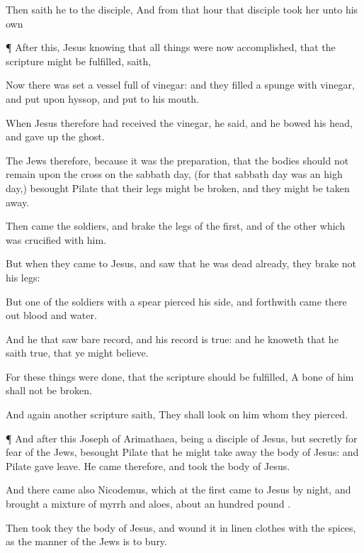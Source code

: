 {Then saith
he to the
disciple,
{}
And
from
that
hour that
disciple
took
her
unto his
own
{}


\par }{\PP {}¶
After
this,
Jesus
knowing
that all
things were
now
accomplished,
that the
scripture might be
fulfilled,
saith,
{}

Now there was
set a
vessel
full of
vinegar:
and they
filled a
spunge with
vinegar,
and
put
{} upon
hyssop, and
put
{} to
his
mouth.

When
Jesus
therefore had
received the
vinegar, he
said,
{}
and he
bowed his
head, and gave
up the
ghost.

The
Jews
therefore,
because it
was the
preparation,
that the
bodies
should
not
remain
upon the
cross
on the sabbath
day, (for
that sabbath
day
was an
high
day,)
besought
Pilate
that
their
legs might be
broken,
and
{} they might be taken
away.

Then
came the
soldiers,
and
brake the
legs of the
first,
and of the
other
which was
crucified with
him.

But
when they
came
to
Jesus, and saw
that
he was
dead
already, they
brake
not
his
legs:

But
one of the
soldiers with a
spear
pierced
his
side,
and
forthwith came there
out
blood
and
water.

And
he that
saw
{} bare
record,
and
his
record
is
true: and
he
knoweth
that he
saith
true,
that
ye might
believe.

For these
things were
done,
that the
scripture should be
fulfilled, A
bone of
him
shall
not be
broken.

And
again
another
scripture
saith, They shall
look
on him
whom they
pierced.


\par }{\PP {}¶
And
after
this
Joseph
of
Arimathaea,
being a
disciple of
Jesus,
but
secretly
for
fear of the
Jews,
besought
Pilate
that he might take
away the
body of
Jesus:
and
Pilate
gave
{}
leave. He
came
therefore,
and
took the
body of
Jesus.

And there
came
also
Nicodemus,
which at the
first
came
to
Jesus by
night, and
brought a
mixture of
myrrh
and
aloes,
about an
hundred
pound
{}.

Then took
they the
body of
Jesus,
and
wound
it in linen
clothes
with the
spices,
as the
manner of the
Jews
is to
bury.

}

